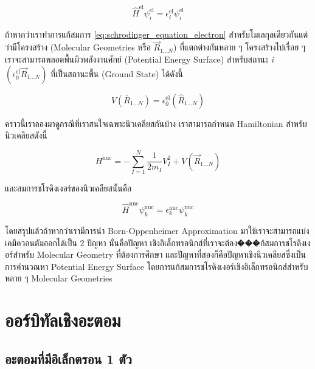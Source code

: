 \begin{equation}
  \label{eq:schrodinger_equation_electron}
  \hat{H}^{\text{el}} \psi^{\text{el}}_{i}
  =
  \epsilon^{\text{el}}_{i} \psi^{\text{el}}_{i}
\end{equation}

ถ้าหากว่าเราทำการแก้สมการ \eqref{eq:schrodinger_equation_electron} สำหรับโมเลกุลเดียวกันแต่ว่ามีโครงสร้าง (Molecular Geometries
หรือ $\vec{R}_{1 \dots N}$) ที่แตกต่างกันหลาย ๆ โครงสร้างไปเรื่อย ๆ เราจะสามารถพลอตพื้นผิวพลังงานศักย์ (Potential Energy Surface)
สำหรับสถานะ $i$ $(\epsilon^{\text{el}}_{0} \vec{R}_{1 \dots N})$ ที่เป็นสถานะพื้น (Ground State) ได้ดังนี้

\begin{equation}
  V\left(\bar{R}_{1 \dots N}\right)
  =
  \epsilon_{0}^{\mathrm{el}}\left(\hat{R}_{1 \dots N}\right)
\end{equation}

คราวนี้เราลองมาดูกรณีที่เราสนใจเฉพาะนิวเคลียสกันบ้าง เราสามารถกำหนด Hamiltonian สำหรับนิวเคลียสดังนี้

\begin{equation}
  \label{eq:hamiltonian_operator_nuclei}
  H^{\text{nuc}}
  =
  - \sum_{I=1}^{N} \frac{1}{2 m_{I}} V_{I}^{2}
  + V\left(\vec{R}_{1 \dots N}\right)
\end{equation}

\noindent และสมการชโรดิงเงอร์ของนิวเคลียสนั้นคือ

\begin{equation}
  \label{eq:schrodinger_equation_nuclei}
  \hat{H}^{\text{nuc}} \psi^{\text{nuc}}_{k}
  =
  \epsilon^{\text{nuc}}_{k} \psi^{\text{nuc}}_{k}
\end{equation}

โดยสรุปแล้วถ้าหากว่าเรามีการนำ Born-Oppenheimer Approximation มาใช้เราจะสามารถแบ่งเคมีควอนตัมออกได้เป็น 2 ปัญหา นั่นคือปัญหา%
เชิงอิเล็กทรอนิกส์ที่เราจะต้อง���ก้สมการชโรดิงเงอร์สำหรับ Molecular Geometry ที่ต้องการศึกษา และปัญหาที่สองก็คือปัญหาเชิงนิวเคลียสซึ่งเป็น%
การคำนวณหา Potential Energy Surface โดยการแก้สมการชโรดิงเงอร์เชิงอิเล็กทรอนิกส์สำหรับหลาย ๆ Molecular Geometries

\section{ออร์บิทัลเชิงอะตอม}

\subsection{อะตอมที่มีอิเล็กตรอน 1 ตัว}

